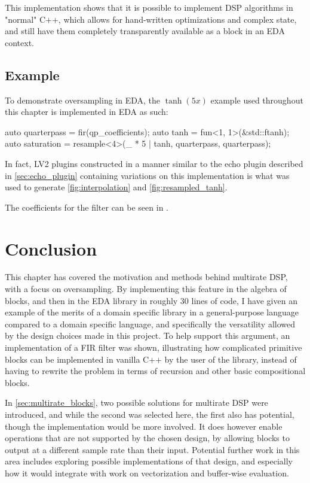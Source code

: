 This implementation shows that it is possible to implement DSP algorithms in "normal" C++, which allows for
hand-written optimizations and complex state, and still have them completely transparently available as a
block in an EDA context.

\subsection{Example}

To demonstrate oversampling in EDA, the $\tanh(5x)$ example used throughout this chapter is
implemented in EDA as such:

\begin{cppcodenl}
  auto quarterpass = fir(qp_coefficients);
  auto tanh = fun<1, 1>(&std::ftanh);
  auto saturation = resample<4>(_ * 5 | tanh, quarterpass, quarterpass);
\end{cppcodenl}

In fact, LV2 plugins constructed in a manner similar to the echo plugin described in \autoref{sec:echo_plugin}
containing variations on this implementation is what was used to generate \autoref{fig:interpolation} and
\autoref{fig:resampled_tanh}.

The coefficients for the filter can be seen in .

\section{Conclusion}

This chapter has covered the motivation and methods behind multirate DSP, with a focus on oversampling. By
implementing this feature in the algebra of blocks, and then in the EDA library in roughly 30 lines of code,
I have given an example of the merits of a domain specific library in a general-purpose language compared to
a domain specific language, and specifically the versatility allowed by the design choices made in this
project. To help support this argument, an implementation of a FIR filter was shown, illustrating how
complicated primitive blocks can be implemented in vanilla C++ by the user of the library, instead of having
to rewrite the problem in terms of recursion and other basic compositional blocks.

In \autoref{sec:multirate_blocks}, two possible solutions for multirate DSP were introduced, and while the second
was selected here, the first also has potential, though the implementation would be more involved. It does
however enable operations that are not supported by the chosen design, by allowing blocks to output at a
different sample rate than their input. Potential further work in this area includes exploring possible
implementations of that design, and especially how it would integrate with work on vectorization and
buffer-wise evaluation.
